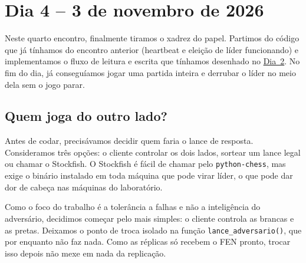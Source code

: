 {}
\section*{Dia 4 -- 3 de novembro de 2026}
\label{dia:4}

Neste quarto encontro, finalmente tiramos o xadrez do papel. Partimos do código que já tínhamos do encontro anterior (heartbeat e eleição de líder funcionando) e implementamos o fluxo de leitura e escrita que tínhamos desenhado no \hyperref[dia:2]{Dia~2}. No fim do dia, já conseguíamos jogar uma partida inteira e derrubar o líder no meio dela sem o jogo parar.

\subsection*{Quem joga do outro lado?}
Antes de codar, precisávamos decidir quem faria o lance de resposta. Consideramos três opções: o cliente controlar os dois lados, sortear um lance legal ou chamar o Stockfish. O Stockfish é fácil de chamar pelo \texttt{python-chess}, mas exige o binário instalado em toda máquina que pode virar líder, o que pode dar dor de cabeça nas máquinas do laboratório.

Como o foco do trabalho é a tolerância a falhas e não a inteligência do adversário, decidimos começar pelo mais simples: o cliente controla as brancas e as pretas. Deixamos o ponto de troca isolado na função \texttt{lance\_adversario()}, que por enquanto não faz nada. Como as réplicas só recebem o FEN pronto, trocar isso depois não mexe em nada da replicação.

